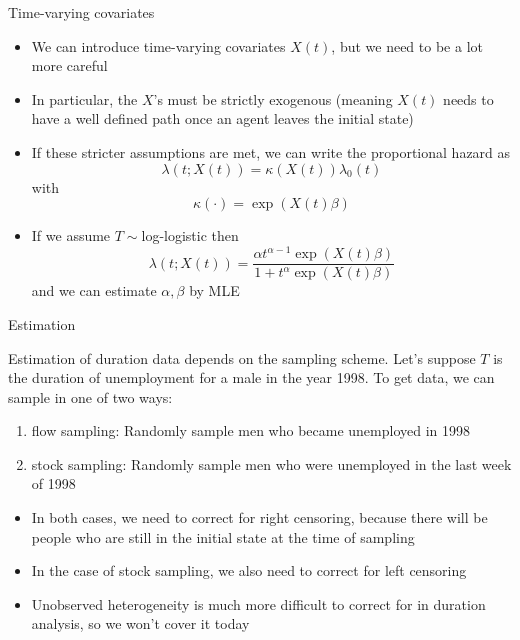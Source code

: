\documentclass[english,xcolor=dvipsnames]{beamer}
\begin{document}
\begin{frame}{Time-varying covariates}
\begin{itemize}
\item We can introduce time-varying covariates $X\left(t\right)$, but we
need to be a lot more careful
\item In particular, the $X$'s must be strictly exogenous (meaning $X\left(t\right)$
needs to have a well defined path once an agent leaves the initial
state)
\item If these stricter assumptions are met, we can write the proportional
hazard as
\[
\lambda\left(t;X\left(t\right)\right)=\kappa\left(X\left(t\right)\right)\lambda_{0}\left(t\right)
\]
with
\[
\kappa\left(\cdot\right)=\exp\left(X\left(t\right)\beta\right)
\]

\item If we assume $T\sim$log-logistic then
\[
\lambda\left(t;X\left(t\right)\right)=\frac{\alpha t^{\alpha-1}\exp\left(X\left(t\right)\beta\right)}{1+t^{\alpha}\exp\left(X\left(t\right)\beta\right)}
\]
and we can estimate $\alpha,\beta$ by MLE
\end{itemize}

\end{frame}


\begin{frame}{Estimation}

Estimation of duration data depends on the sampling scheme. Let's
suppose $T$ is the duration of unemployment for a male in the year
1998. To get data, we can sample in one of two ways:
\begin{enumerate}
\item flow sampling: Randomly sample men who became unemployed in 1998
\item stock sampling: Randomly sample men who were unemployed in the last
week of 1998\end{enumerate}
\begin{itemize}
\item In both cases, we need to correct for right censoring, because there
will be people who are still in the initial state at the time of sampling
\item In the case of stock sampling, we also need to correct for left censoring
\item Unobserved heterogeneity is much more difficult to correct for in
duration analysis, so we won't cover it today
\end{itemize}

\end{frame}
\end{document}
